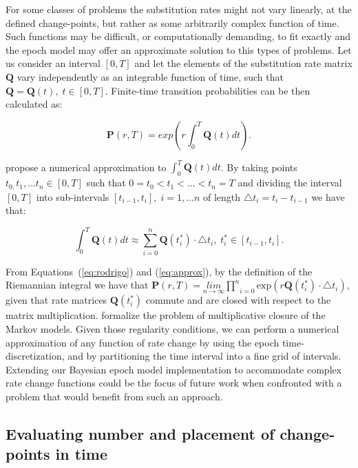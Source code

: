For some classes of problems the substitution rates might not vary linearly, at the defined change-points, but rather as some arbitrarily complex function of time. 
Such functions may be difficult, or computationally demanding, to fit exactly and the epoch model may offer an approximate solution to this types of problems.
Let us consider an interval $\left[0,T\right]$ and let the elements of the substitution rate matrix $\mathbf{Q}$ vary independently as an integrable function of time, such that $\mathbf{Q}=\mathbf{Q}(t),\; t\in\left[0,T\right]$. 
Finite-time transition probabilities can be then calculated as: 

\begin{equation}
\ensuremath{\mathbf{P}}(r,T)=exp\left(r\int_{0}^{T}\mathbf{Q}(t)dt\right).\label{eq:rodrigo}
\end{equation}

\noindent
\citet{Rodrigo2008} propose a numerical approximation to $\int_{0}^{T}\mathbf{Q}(t)dt$. 
By taking points $t_{0,}t_{1},\ldots t_{n}\in[0,T]$ such that $0=t_{0}<t_{1}<\ldots<t_{n}=T$ and dividing the interval $\left[0,T\right]$ into sub-intervals $\left[t_{i-1},t_{i}\right],\; i=1,\ldots n$ of length $\triangle t_{i}=t_{i}-t_{i-1}$ we have that:   

\begin{equation}
\int_{0}^{T}\mathbf{Q}(t)dt\approx\underset{i=0}{\overset{n}{\sum}}\mathbf{Q}(t_{i}^{*})\cdot\triangle t_{i},\; t_{i}^{*}\in[t_{i-1},t_{i}].\label{eq:approx}
\end{equation}

\noindent
From Equations~(\ref{eq:rodrigo}) and (\ref{eq:approx}), by the definition of the Riemannian integral we have that $\mathbf{P}(r,T)=\underset{n\rightarrow\infty}{lim}\underset{i=0}{\overset{n}{\prod}}\text{exp}\left(r\mathbf{Q}(t_{i}^{*})\cdot\triangle t_{i}\right)$, given that rate matrices $\mathbf{Q}(t_{i}^{*})$ commute 
and are closed with respect to the matrix multiplication.
\citet{Sumner2012} formalize the problem of multiplicative closure of the Markov models. 
Given those regularity conditions, we can perform a numerical approximation of any function of rate change by using the epoch time-discretization, and by partitioning the time interval into a fine grid of intervals.
Extending our Bayesian epoch model implementation to accommodate complex rate change functions could be the focus of future work when confronted with a problem that would benefit from such an approach.

\subsection{Evaluating number and placement of change-points in time}

